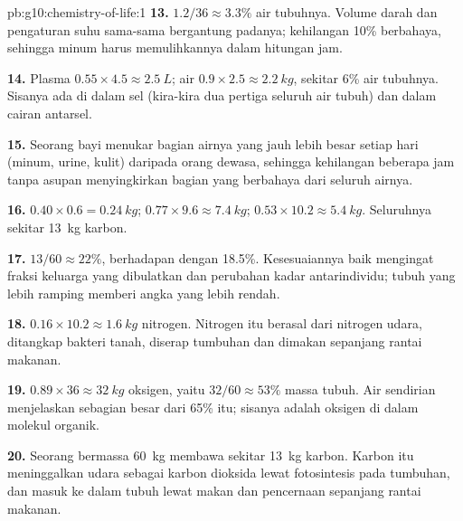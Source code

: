 \begin{solution}{pb:g10:chemistry-of-life:1}
\textbf{13.} $1.2/36 \approx 3.3\%$ air tubuhnya. Volume darah dan
pengaturan suhu sama-sama bergantung padanya; kehilangan 10\%
berbahaya, sehingga minum harus memulihkannya dalam hitungan jam.

\textbf{14.} Plasma $0.55 \times 4.5 \approx \qty{2.5}{L}$; air $0.9
\times 2.5 \approx \qty{2.2}{kg}$, sekitar 6\% air tubuhnya. Sisanya
ada di dalam sel (kira-kira dua pertiga seluruh air tubuh) dan dalam
cairan antarsel.

\textbf{15.} Seorang bayi menukar bagian airnya yang jauh lebih besar
setiap hari (minum, urine, kulit) daripada orang dewasa, sehingga
kehilangan beberapa jam tanpa asupan menyingkirkan bagian yang
berbahaya dari seluruh airnya.

\textbf{16.}  $0.40 \times 0.6 = \qty{0.24}{kg}$; 
$0.77 \times 9.6 \approx \qty{7.4}{kg}$;  $0.53 \times 10.2
\approx \qty{5.4}{kg}$. Seluruhnya sekitar \qty{13}{kg} karbon.

\textbf{17.} $13/60 \approx 22\%$, berhadapan dengan 18.5\%.
Kesesuaiannya baik mengingat fraksi keluarga yang dibulatkan dan
perubahan kadar  antarindividu; tubuh yang lebih ramping memberi
angka yang lebih rendah.

\textbf{18.} $0.16 \times 10.2 \approx \qty{1.6}{kg}$ nitrogen.
Nitrogen itu berasal dari nitrogen udara, ditangkap bakteri tanah,
diserap tumbuhan dan dimakan sepanjang rantai makanan.

\textbf{19.} $0.89 \times 36 \approx \qty{32}{kg}$ oksigen, yaitu
$32/60 \approx 53\%$ massa tubuh. Air sendirian menjelaskan sebagian
besar dari 65\% itu; sisanya adalah oksigen di dalam molekul organik.

\textbf{20.} Seorang bermassa \qty{60}{kg} membawa sekitar \qty{13}{kg}
karbon. Karbon itu meninggalkan udara sebagai karbon dioksida lewat
fotosintesis pada tumbuhan, dan masuk ke dalam tubuh lewat makan dan
pencernaan sepanjang rantai makanan.
\end{solution}

